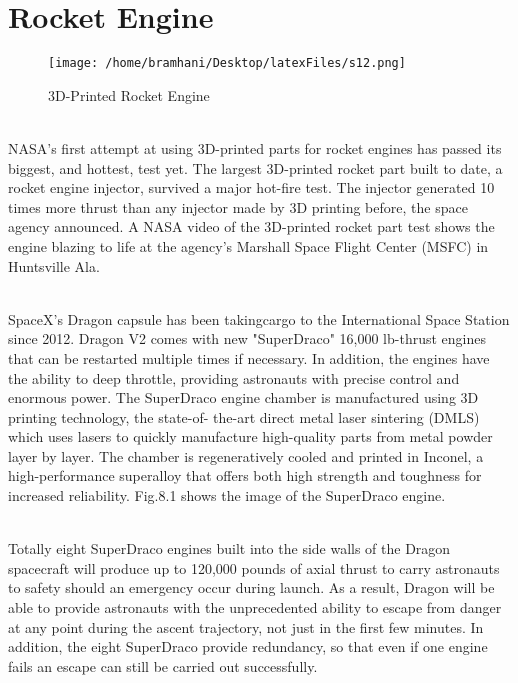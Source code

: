 \documentclass[12pt,a4paper]{report}
\begin{document}
	
	\section{Rocket Engine}
	\begin{figure}[H]
		\centering
		\texttt{[image: /home/bramhani/Desktop/latexFiles/s12.png]}
		\label{fig:3D-Printed Rocket Engine}
		\caption{3D-Printed Rocket Engine}
	\end{figure}
	\noindent
	\\NASA's first attempt at using 3D-printed parts for rocket engines has passed its biggest, and
	hottest, test yet. The largest 3D-printed rocket part built to date, a rocket engine injector, survived a
	major hot-fire test. The injector generated 10 times more thrust than any injector made by 3D
	printing before, the space agency announced. A NASA video of the 3D-printed rocket part test
	shows the engine blazing to life at the agency's Marshall Space Flight Center (MSFC) in Huntsville
	Ala.\par
	
	\noindent
	\\SpaceX's Dragon capsule has been takingcargo to the International Space Station since 2012.
	Dragon V2 comes with new "SuperDraco" 16,000 lb-thrust engines that can be restarted multiple
	times if necessary. In addition, the engines have the ability to deep throttle, providing astronauts
	with precise control and enormous power.
	The SuperDraco engine chamber is manufactured using 3D printing technology, the state-of-
	the-art direct metal laser sintering (DMLS) which uses lasers to quickly manufacture high-quality
	parts from metal powder layer by layer. The chamber is regeneratively cooled and printed in
	Inconel, a high-performance superalloy that offers both high strength and toughness for increased
	reliability. Fig.8.1 shows the image of the SuperDraco engine.\par
	
	\noindent
	\\Totally eight SuperDraco engines built into the side walls of the Dragon spacecraft will
	produce up to 120,000 pounds of axial thrust to carry astronauts to safety should an emergency
	occur during launch. As a result, Dragon will be able to provide astronauts with the unprecedented
	ability to escape from danger at any point during the ascent trajectory, not just in the first few
	minutes.
	In addition, the eight SuperDraco provide redundancy, so that even if one engine fails an
	escape can still be carried out successfully.\par
	
\end{document}
